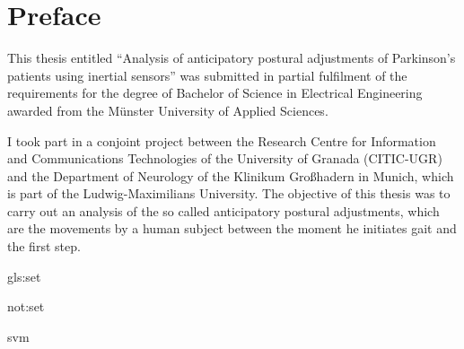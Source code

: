 \chapter*{Preface}

This thesis entitled ``Analysis of anticipatory postural adjustments of Parkinson's patients using inertial sensors'' was submitted in partial fulfilment of the requirements for the degree of Bachelor of Science in Electrical Engineering awarded from the Münster University of Applied Sciences.

I took part in a conjoint project between the Research Centre for Information and Communications Technologies of the University of Granada (CITIC-UGR) and the Department of Neurology of the Klinikum Großhadern in Munich, which is part of the Ludwig-Maximilians University. The objective of this thesis was to carry out an analysis of the so called anticipatory postural adjustments, which are the movements by a human subject between the moment he initiates gait and the first step.

\gls{gls:set}

\gls{not:set}

\gls{svm}






